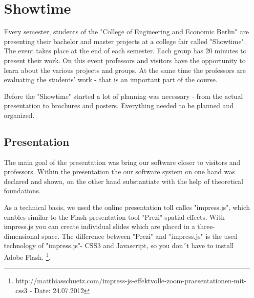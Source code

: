 \chapter{Showtime}\label{chap:Showtime}

Every semester, students of the "College of Engineering and Economic Berlin" are presenting their bachelor and master projects at a college fair called "Showtime". The event takes place at the end of each semester. Each group has 20 minutes to present their work. On this event professors and visitors have the opportunity to learn about the various projects and groups. At the same time the professors are evaluating the students' work - that is an important part of the course.

Before the "Showtime" started a lot of planning was necessary - from the actual presentation to brochures and posters. Everything needed to be planned and organized.

\section{Presentation}

The main goal of the presentation was bring our software closer to visitors and professors. 
Within the presentation the our software system on one hand was declared and shown, on the other hand substantiate with the help of theoretical foundations.

As a technical basis, we used the online presentation toll calles "impress.js", which enables similar to the Flash presentation tool "Prezi" spatial effects. With impress.js you can create individual slides which are placed in a three-dimensional space. The difference between "Prezi" and "impress.js" is the used technology of "impress.js"- CSS3 and Javascript, so you don´t have to install Adobe Flash. \footnote{http://matthiasschuetz.com/impress-js-effektvolle-zoom-praesentationen-mit-css3 - Date: 24.07.2012}.


